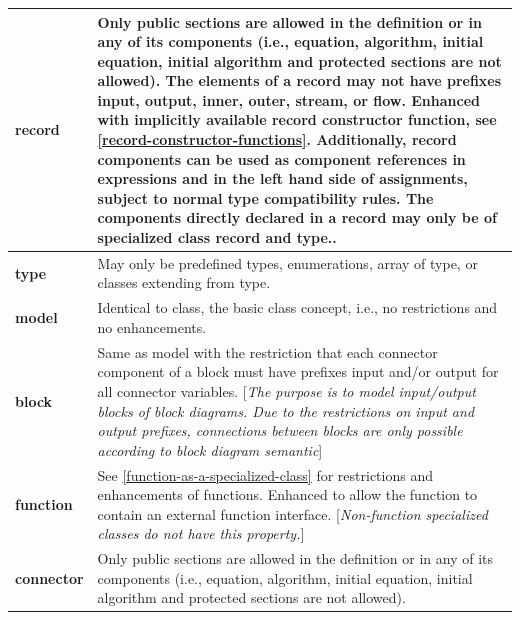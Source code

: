 \documentclass[10pt,a4paper]{report}
\begin{document}
\begin{longtable}{|p{4cm}|p{9cm}|} 
\hline \endhead
\textbf{record} & Only public sections are allowed in the definition or
in any of its components (i.e., equation, algorithm, initial equation,
initial algorithm and protected sections are not allowed). The elements
of a record may not have prefixes input, output, inner, outer, stream,
or flow. Enhanced with implicitly available record constructor function,
see \ref{record-constructor-functions}. Additionally, record components can be used as
component references in expressions and in the left hand side of
assignments, subject to normal type compatibility rules. The components
directly declared in a record may only be of specialized class record
and type..\\ \hline
\textbf{type} & May only be predefined types, enumerations, array of
type, or classes extending from type.\\ \hline
\textbf{model} & Identical to class, the basic class concept, i.e., no
restrictions and no enhancements.\\ \hline
\textbf{block} & Same as model with the restriction that each connector
component of a block must have prefixes input and/or output for all
connector variables. {[}\emph{The purpose is to model input/output
blocks of block diagrams. Due to the restrictions on input and output
prefixes, connections between blocks are only possible according to
block diagram semantic}{]}\\ \hline
\textbf{function} & See \ref{function-as-a-specialized-class} for restrictions
and enhancements of functions. Enhanced to allow the
function to contain an external function interface.
{[}\emph{Non-function specialized classes do not have this
property.}{]}\\ \hline
\textbf{connector} & Only public sections are allowed in the definition or in any of its
components (i.e., equation, algorithm, initial equation, initial
algorithm and protected sections are not allowed).


\end{longtable}
\end{document}

